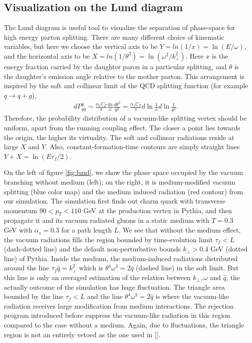 \subsection{Visualization on the Lund diagram}
The Lund diagram is useful tool to visualize the separation of phase-space for high energy parton splitting.
There are many different choice of kinematic variables, but here we choose the vertical axis to be $Y = ln(1/x) = \ln(E/\omega)$, and the horizontal 
axis to be $X = ln(1/\theta^2) = \ln(\omega^2/k_\perp^2)$.
Here $x$ is the energy fraction carried by the daughter paron in a particular splitting, and $\theta$ is the daughter's emission angle relative to the mother parton.
This arrangement is inspired by the soft and collinear limit of the QCD splitting function (for example $q\rightarrow q+g$),
\begin{eqnarray}
dP^{q}_{qg} \sim \frac{\alpha_s C_F}{\pi} \frac{dx}{x}\frac{d\theta^2}{\theta^2} = \frac{\alpha_s C_F}{\pi} d\ln\frac{1}{x} d\ln\frac{1}{\theta^2}.
\end{eqnarray}
Therefore, the probability distribution of a vacuum-like splitting vertex should be uniform, apart from the running coupling effect.
The closer a point lies towards the origin, the higher its virtuality.
The soft and collinear radiations reside at large $X$ and $Y$.
Also, constant-formation-time contours are simply straight lines $Y+X=\ln(E\tau_f/2)$.

On the left of figure \ref{fig:lund}, we show the phase space occupied by the vacuum branching without medium (left); on the right, it is medium-modified vacuum splitting (blue color map) and the medium induced radiation (red contour) from our simulation.
The simulation first finds out charm quark with transverse momentum $90 < p_T <110$ GeV at the production vertex in Pythia, and then propagate it and its vacuum radiated gluons in a static medium with $T=0.3$ GeV with $\alpha_s = 0.3$ for a path length $L$.
We see that without the medium effect, the vacuum radiations fills the region bounded by time-evolution limit $\tau_f < L$ (dash-dotted line) and the default non-perturbative bounds $k_\perp > 0.4$ GeV (dotted line) of Pythia. 
Inside the medium, the medium-induced radiations distributed around the line $\tau_f\hat{q} = k_\perp^2$ which is $\theta^4\omega^3 = 2\hat{q}$ (dashed line) in the soft limit.  
But this line is only an averaged estimation of the relation between $k_\perp, \omega$ and $\hat{q}$, the actually outcome of the simulation has huge fluctuation.
The triangle area bounded by the line $\tau_f < L$ and the line $\theta^4\omega^3 = 2\hat{q}$ is where the vacuum-like radiation receives large modification from medium interactions.
The rejection program introduced before suppress the vacuum-like radiation in this region compared to the case without a medium.
Again, due to fluctuations, the triangle region is not an entirely vetoed as the one used in [].


